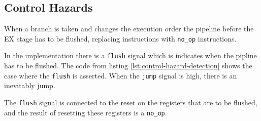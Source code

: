 \subsection{Control Hazards}
When a branch is taken and changes the execution order the pipeline before the EX stage has to be flushed,
replacing instructions with \texttt{no\_op} instructions.

In the implementation there is a \texttt{flush} signal which is indicates when the pipline has to be flushed.
The code from listing \ref{lst:control-hazard-detection} shows the case where the \texttt{flush} is asserted.
When the \texttt{jump} signal is high, there is an inevitably jump.


The \texttt{flush} signal is connected to the reset on the registers that are to be flushed,
and the result of resetting these registers is a \texttt{no\_op}.

